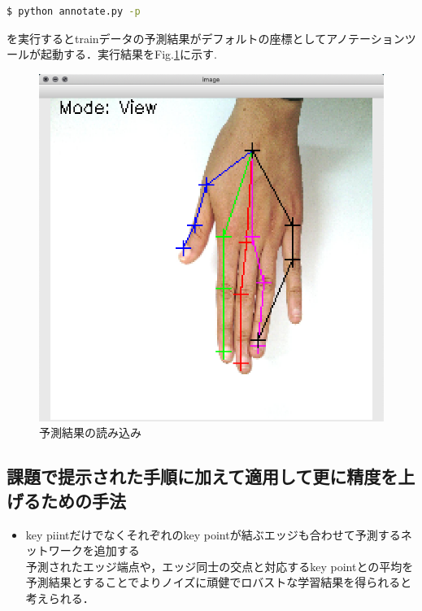 \documentclass[a4paper, 11pt]{article}
\newcommand{\figref}[1]{Fig.\hspace{1mm}\ref{#1}}
\begin{document}
\begin{lstlisting}[language=bash]
  $ python annotate.py -p
\end{lstlisting}

を実行するとtrainデータの予測結果がデフォルトの座標としてアノテーションツールが起動する．実行結果を\figref{fig:predicted}に示す.

\begin{figure}[H]
  \begin{center}
    \includegraphics[width=0.25\linewidth]{./imgs/predicted.png}
  \end{center}
	\caption{予測結果の読み込み}
  \label{fig:predicted}
\end{figure}

\subsection*{課題で提示された手順に加えて適用して更に精度を上げるための手法}
\begin{itemize}
  \item key piintだけでなくそれぞれのkey pointが結ぶエッジも合わせて予測するネットワークを追加する\\
    予測されたエッジ端点や，エッジ同士の交点と対応するkey pointとの平均を予測結果とすることでよりノイズに頑健でロバストな学習結果を得られると考えられる．
\end{itemize}
\end{document}
